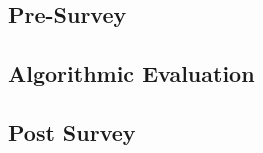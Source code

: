 \subsection{Pre-Survey}
\label{sec:pre-survey}

\subsection{Algorithmic Evaluation}
\label{sec:algor-eval}


\subsection{Post Survey}
\label{sec:post-survey}


